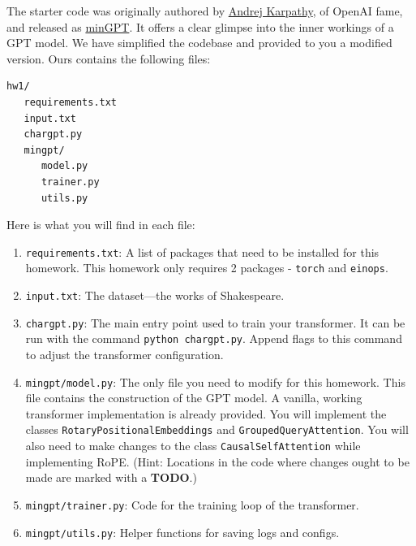 \documentclass[11pt,addpoints,answers]{exam}
\begin{document}
\begin{questions}
 The starter code was originally authored by \href{https://karpathy.ai/}{Andrej Karpathy}, of OpenAI fame, and released as \href{https://github.com/karpathy/minGPT}{minGPT}. It offers a clear glimpse into the inner workings of a GPT model. We have simplified the codebase and provided to you a modified version. Ours contains the following files:
\begin{verbatim}
hw1/
   requirements.txt
   input.txt
   chargpt.py
   mingpt/
      model.py
      trainer.py
      utils.py
\end{verbatim}
Here is what you will find in each file:
\begin{enumerate}
    
    \item \lstinline{requirements.txt}: A list of packages that need to be installed for this homework. This homework only requires 2 packages - \lstinline{torch} and \lstinline{einops}.
    
    \item \lstinline{input.txt}: The dataset---the works of Shakespeare.
    
    \item \lstinline{chargpt.py}: The main entry point used to train your transformer. It can be run with the command \lstinline{python chargpt.py}. Append flags to this command to adjust the transformer configuration.
    
    \item \lstinline{mingpt/model.py}: The only file you need to modify for this homework. This file contains the construction of the GPT model. A vanilla, working transformer implementation is already provided. You will implement the classes \lstinline{RotaryPositionalEmbeddings} and \lstinline{GroupedQueryAttention}. You will also need to make changes to the class \lstinline{CausalSelfAttention} while implementing RoPE. (Hint: Locations in the code where changes ought to be made are marked with a \textbf{TODO}.)

    \item \lstinline{mingpt/trainer.py}: Code for the training loop of the transformer.
    
    \item \lstinline{mingpt/utils.py}: Helper functions for saving logs and configs.
    
\end{enumerate}


\end{questions}
\end{document}
